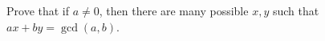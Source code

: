   Prove that if $a \neq 0$, then
  there are many possible $x, y$ such that
  $ax + by = \gcd(a,b)$.

